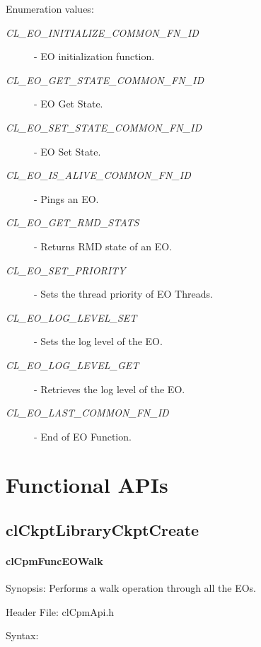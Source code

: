 {\begin{Desc}
\item[Enumeration values: ]\par
\begin{description}
\item[{\em CL\_\-EO\_\-INITIALIZE\_\-COMMON\_\-FN\_\-ID}] - EO initialization function. 
\item[{\em CL\_\-EO\_\-GET\_\-STATE\_\-COMMON\_\-FN\_\-ID}] - EO Get State. 
\item[{\em CL\_\-EO\_\-SET\_\-STATE\_\-COMMON\_\-FN\_\-ID}] - EO Set State. 
\item[{\em CL\_\-EO\_\-IS\_\-ALIVE\_\-COMMON\_\-FN\_\-ID}] - Pings an EO. 
\item[{\em CL\_\-EO\_\-GET\_\-RMD\_\-STATS}] - Returns RMD state of an EO. 
\item[{\em CL\_\-EO\_\-SET\_\-PRIORITY}] - Sets the thread priority of EO Threads. 
\item[{\em CL\_\-EO\_\-LOG\_\-LEVEL\_\-SET}] - Sets the log level of the EO. 
\item[{\em CL\_\-EO\_\-LOG\_\-LEVEL\_\-GET}] - Retrieves the log level of the EO. 
\item[{\em CL\_\-EO\_\-LAST\_\-COMMON\_\-FN\_\-ID}] - End of EO Function. 
\end{description}
\end{Desc}

\newpage
\section{Functional APIs}

\subsection{clCkptLibraryCkptCreate}
\hypertarget{pagecpm102}{}\paragraph{cl\-Cpm\-Func\-EOWalk}\label{pagecpm102}
\begin{Desc}
\item[Synopsis:]Performs a walk operation through all the EOs.\end{Desc}
\begin{Desc}
\item[Header File:]clCpmApi.h\end{Desc}
\begin{Desc}
\item[Syntax:]


\end{Desc}}
